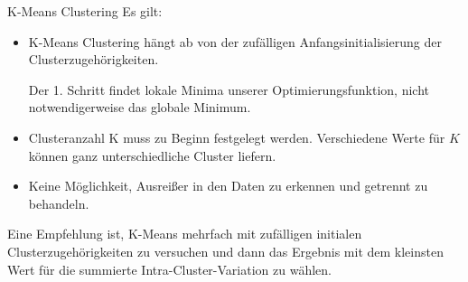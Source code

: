 \begin{defi}{K-Means Clustering}
    Es gilt:
    \begin{itemize}
        \item K-Means Clustering hängt ab von der zufälligen Anfangsinitialisierung der Clusterzugehörigkeiten.

              Der 1. Schritt findet lokale Minima unserer Optimierungsfunktion, nicht notwendigerweise das globale Minimum.
        \item Clusteranzahl K muss zu Beginn festgelegt werden.
              Verschiedene Werte für $K$ können ganz unterschiedliche Cluster liefern.
        \item Keine Möglichkeit, Ausreißer in den Daten zu erkennen und getrennt zu behandeln.
    \end{itemize}

    Eine Empfehlung ist, K-Means mehrfach mit zufälligen initialen Clusterzugehörigkeiten zu versuchen und dann das Ergebnis mit dem kleinsten Wert für die summierte Intra-Cluster-Variation zu wählen.
\end{defi}

